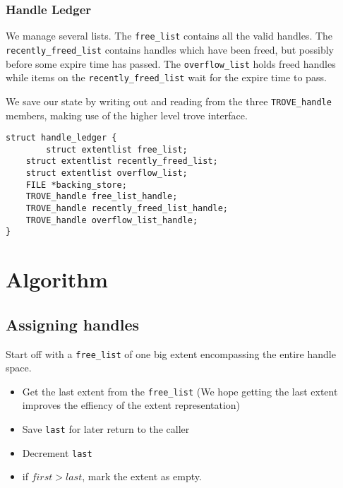 \documentclass[10pt]{article} %
\begin{document}
\subsubsection{Handle Ledger}
We manage several lists.  The \texttt{free\_list} contains all the valid
handles. The \texttt{recently\_freed\_list} contains handles which have been
freed, but possibly before some expire time has passed.  The
\texttt{overflow\_list} holds freed handles while items on the
\texttt{recently\_freed\_list} wait for the expire time to pass.

We save our state by writing out and reading from the three
\texttt{TROVE\_handle} members, making use of the higher level trove
interface. 
\begin{verbatim}
struct handle_ledger {
        struct extentlist free_list;
	struct extentlist recently_freed_list;
	struct extentlist overflow_list;
	FILE *backing_store;
	TROVE_handle free_list_handle;
	TROVE_handle recently_freed_list_handle;
	TROVE_handle overflow_list_handle;
}
\end{verbatim}

\section{Algorithm}
\subsection {Assigning handles}
Start off with a \texttt{free\_list} of one big extent encompassing the
entire handle space.
\begin{itemize}
\item Get the last extent from the \texttt{free\_list} (We hope getting
the last extent improves the effiency of the extent representation)
\item Save \texttt{last} for later return to the caller
\item Decrement \texttt{last}
\item if $ first > last $, mark the extent as empty. 
\end{itemize}
\end{document}
